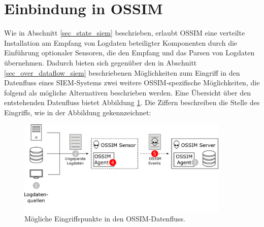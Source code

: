 \section{Einbindung in OSSIM}

\label{sec_impl_integration_into_ossim}

%
%
%
%

Wie in Abschnitt \ref{sec_state_siem} beschrieben, erlaubt OSSIM eine verteilte Installation am Empfang von Logdaten beteiligter Komponenten durch die Einführung optionaler Sensoren, die den Empfang und das Parsen von Logdaten übernehmen. Dadurch bieten sich gegenüber den in Abschnitt \ref{sec_over_dataflow_siem} beschriebenen Möglichkeiten zum Eingriff in den Datenfluss eines SIEM-Systems zwei weitere OSSIM-spezifische Möglichkeiten, die folgend als mögliche Alternativen beschrieben werden. Eine Übersicht über den entstehenden Datenfluss bietet Abbildung \ref{fig:ossim_data_access_point}. Die Ziffern beschreiben die Stelle des Eingriffs, wie in der Abbildung gekennzeichnet:

\begin{figure}[]
    \centering
        \includegraphics[width=0.9\textwidth]{dia/ossim_data_access_point.pdf}
    \caption{Mögliche Eingriffspunkte in den OSSIM-Datenfluss.}
    \label{fig:ossim_data_access_point}
\end{figure}

